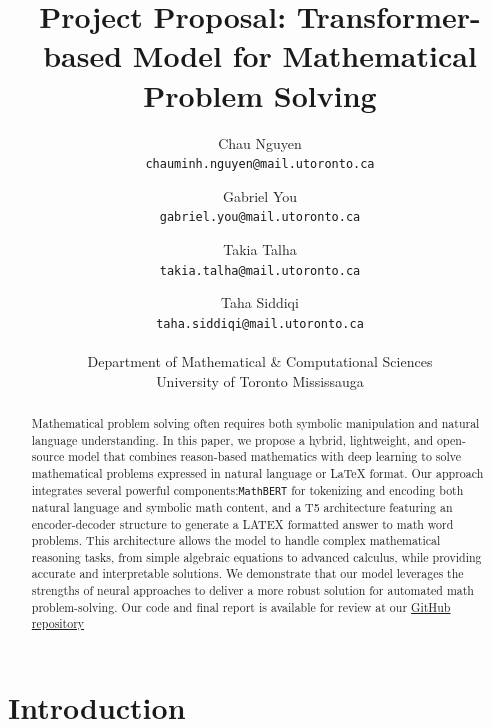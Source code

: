 \documentclass{article}
\title{Project Proposal: Transformer-based Model for Mathematical Problem Solving}
\author{%
    Chau Nguyen \\
    \texttt{chauminh.nguyen@mail.utoronto.ca} \\
    \and
    Gabriel You \\
    \texttt{gabriel.you@mail.utoronto.ca} \\
    \and
    Takia Talha \\
    \texttt{takia.talha@mail.utoronto.ca} \\
    \and
    Taha Siddiqi \\
    \texttt{taha.siddiqi@mail.utoronto.ca} \\
    \\
    Department of Mathematical \& Computational Sciences \\
    University of Toronto Mississauga
}
\begin{document}
\maketitle


\begin{abstract}

  Mathematical problem solving often requires both symbolic manipulation and natural language understanding. In this paper, we propose a hybrid, lightweight, and open-source model that combines reason-based mathematics with deep learning to solve mathematical problems expressed in natural language or LaTeX format. Our approach integrates several powerful components:\texttt{MathBERT} for tokenizing and encoding both natural language and symbolic math content, and a T5 architecture featuring an encoder-decoder structure to generate a LATEX formatted answer to math word problems. This architecture allows the model to handle complex mathematical reasoning tasks, from simple algebraic equations to advanced calculus, while providing accurate and interpretable solutions. We demonstrate that our  model leverages the strengths of neural approaches to deliver a more robust solution for automated math problem-solving. Our code and final report is available for review at our \href{https://github.com/chloe-nguyenminh/csc413_project}{GitHub repository} 
  \end{abstract}
\section{Introduction}
\end{document}
